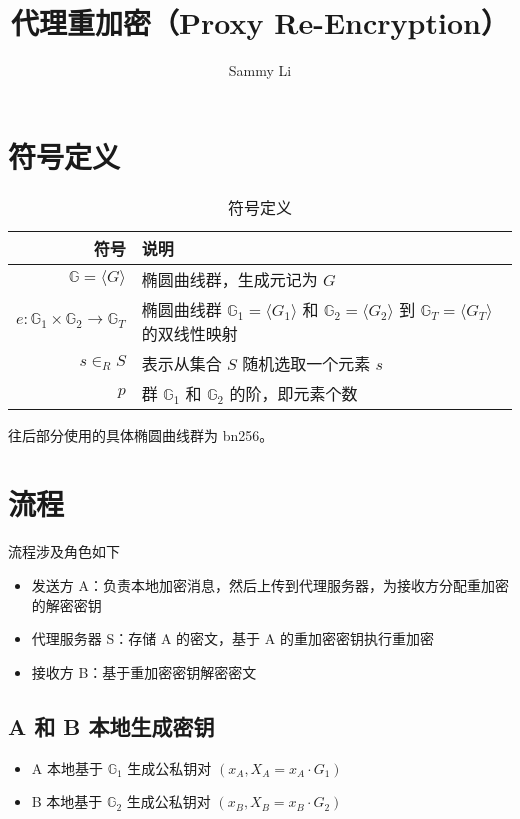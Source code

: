 \documentclass[a4paper,10pt]{article}
\title{代理重加密（Proxy Re-Encryption）}
\date{\DTMdate{2020-11-18}}
\author{Sammy Li}
\newcommand{\bG}{\mathbb{G}}
\begin{document}
\maketitle

\tableofcontents

\section{符号定义}
\begin{table}[!htbp]
  \centering
  \caption{符号定义}
  \begin{tabular}{|r|l|}
    \hline
    符号 & 说明 \\
    \hline
    \(\bG=\langle G\rangle\) & 椭圆曲线群，生成元记为 \(G\) \\
    \(e: \bG_1\times \bG_2\rightarrow\bG_T\) & 椭圆曲线群 \(\bG_1=\langle G_1\rangle\) 和 \(\bG_2=\langle G_2\rangle\) 到 \(\bG_T=\langle G_T\rangle\) 的双线性映射 \\
    \(s\in_R S\) & 表示从集合 \(S\) 随机选取一个元素 \(s\) \\ 
    \(p\) & 群 \(\bG_1\) 和 \(\bG_2\) 的阶，即元素个数 \\
    \hline
  \end{tabular} 
\end{table}

往后部分使用的具体椭圆曲线群为 bn256\cite{2005Pairing,2010New}。

\section{流程}
流程涉及角色如下
\begin{itemize}
  \item 发送方 A：负责本地加密消息，然后上传到代理服务器，为接收方分配重加密的解密密钥
  \item 代理服务器 S：存储 A 的密文，基于 A 的重加密密钥执行重加密
  \item 接收方 B：基于重加密密钥解密密文
\end{itemize}

\subsection{A 和 B 本地生成密钥}
\begin{itemize}
  \item A 本地基于 \(\bG_1\) 生成公私钥对 \((x_A,X_A=x_A\cdot G_1)\)
  \item B 本地基于 \(\bG_2\) 生成公私钥对 \((x_B,X_B=x_B\cdot G_2)\)
\end{itemize}
\end{document}
